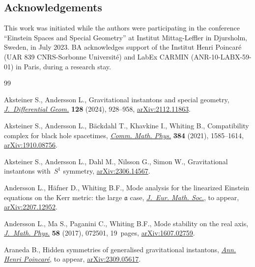 \documentclass[10pt,a4paper]{amsart}
\numberwithin{equation}{section}
\begin{document}
\subsection*{Acknowledgements}

This work was initiated while the authors were participating in the conference ``Einstein Spaces and Special Geometry'' at Institut Mittag-Leffler in Djursholm, Sweden, in July 2023. BA acknowledges support of the Institut Henri Poincar\'e (UAR 839 CNRS-Sorbonne Universit\'e) and LabEx CARMIN (ANR-10-LABX-59-01) in Paris, during a research stay.


\begin{thebibliography}{99}
\footnotesize\itemsep=0pt

Aksteiner S., Andersson L., Gravitational instantons and special geometry,
 \href{https://doi.org/10.4310/jdg/1729092451}{\textit{J.~Differential Geom.}} \textbf{128} (2024), 928--958,
 \href{https://arxiv.org/abs/2112.11863}{arXiv:2112.11863}.

Aksteiner S., Andersson L., B\"ackdahl T., Khavkine I., Whiting B.,
 Compatibility complex for black hole spacetimes, \href{https://doi.org/10.1007/s00220-021-04078-y}{\textit{Comm. Math. Phys.}}
 \textbf{384} (2021), 1585--1614, \href{https://arxiv.org/abs/1910.08756}{arXiv:1910.08756}.

Aksteiner S., Andersson L., Dahl M., Nilsson G., Simon W., Gravitational
 instantons with~{$S^1$} symmetry, \href{https://arxiv.org/abs/2306.14567}{arXiv:2306.14567}.

Andersson L., H\"afner D., Whiting B.F., Mode analysis for the linearized
 {E}instein equations on the {K}err metric: the large $\mathfrak{a}$ case,
 \href{https://doi.org/10.4171/JEMS/1544}{\textit{J.~Eur. Math. Soc.}}, {t}o appear, \href{https://arxiv.org/abs/2207.12952}{arXiv:2207.12952}.

Andersson L., Ma S., Paganini C., Whiting B.F., Mode stability on the real
 axis, \href{https://doi.org/10.1063/1.4991656}{\textit{J.~Math. Phys.}} \textbf{58} (2017), 072501, 19~pages,
 \href{https://arxiv.org/abs/1607.02759}{arXiv:1607.02759}.

Araneda B., Hidden symmetries of generalised gravitational instantons,
 \href{https://doi.org/10.1007/s00023-024-01515-1}{\textit{Ann. Henri Poincar\'e}}, {t}o appear, \href{https://arxiv.org/abs/2309.05617}{arXiv:2309.05617}.


\end{thebibliography}
\end{document}
